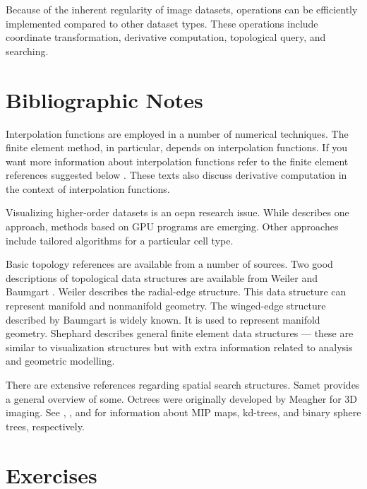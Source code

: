 Because of the inherent regularity of image datasets, operations can be efficiently implemented compared to other dataset types. These operations include coordinate transformation, derivative computation, topological query, and searching.

\section{Bibliographic Notes}
\label{bibnote:advanced_data_representation}

Interpolation functions are employed in a number of numerical techniques. The finite element method, in particular, depends on interpolation functions. If you want more information about interpolation functions refer to the finite element references suggested below \cite{Cook89} \cite{Gallagher75} \cite{Zienkiewicz87}. These texts also discuss derivative computation in the context of interpolation functions.

Visualizing higher-order datasets is an oepn research issue. While \cite{Schroeder06} describes one approach, methods based on GPU programs are emerging. Other approaches include tailored algorithms for a particular cell type.

Basic topology references are available from a number of sources. Two good descriptions of topological data structures are available from Weiler \cite{Weiler86} \cite{Weiler88} and Baumgart \cite{Baumgart74}. Weiler describes the radial-edge structure. This data structure can represent manifold and nonmanifold geometry. The winged-edge structure described by Baumgart is widely known. It is used to represent manifold geometry. Shephard \cite{Shephard88} describes general finite element data structures  --- these are similar to visualization structures but with extra information related to analysis and geometric modelling.

There are extensive references regarding spatial search structures. Samet \cite{Samet90} provides a general overview of some. Octrees were originally developed by Meagher \cite{Meagher82} for 3D imaging. See \cite{Williams83}, \cite{Bentley75}, and \cite{Quinlan94} for information about MIP maps, kd-trees, and binary sphere trees, respectively.

\printbibliography


\section{Exercises}

